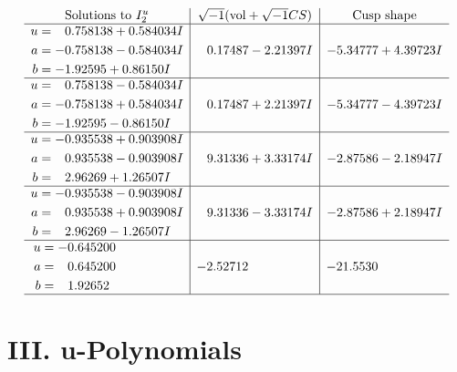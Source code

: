 \documentclass[1p]{elsarticle_modified}
\theoremstyle{definition}
\newcommand{\I}{\sqrt{-1}}
\begin{document}
$$\begin{array}{c|c|c}  
\text{Solutions to }I^u_{2}& \I (\text{vol} + \sqrt{-1}CS) & \text{Cusp shape}\\
 \hline 
\begin{aligned}
u &= \phantom{-}0.758138 + 0.584034 I \\
a &= -0.758138 - 0.584034 I \\
b &= -1.92595 + 0.86150 I\end{aligned}
 & \phantom{-}0.17487 - 2.21397 I & -5.34777 + 4.39723 I \\ \hline\begin{aligned}
u &= \phantom{-}0.758138 - 0.584034 I \\
a &= -0.758138 + 0.584034 I \\
b &= -1.92595 - 0.86150 I\end{aligned}
 & \phantom{-}0.17487 + 2.21397 I & -5.34777 - 4.39723 I \\ \hline\begin{aligned}
u &= -0.935538 + 0.903908 I \\
a &= \phantom{-}0.935538 - 0.903908 I \\
b &= \phantom{-}2.96269 + 1.26507 I\end{aligned}
 & \phantom{-}9.31336 + 3.33174 I & -2.87586 - 2.18947 I \\ \hline\begin{aligned}
u &= -0.935538 - 0.903908 I \\
a &= \phantom{-}0.935538 + 0.903908 I \\
b &= \phantom{-}2.96269 - 1.26507 I\end{aligned}
 & \phantom{-}9.31336 - 3.33174 I & -2.87586 + 2.18947 I \\ \hline\begin{aligned}
u &= -0.645200\phantom{ +0.000000I} \\
a &= \phantom{-}0.645200\phantom{ +0.000000I} \\
b &= \phantom{-}1.92652\phantom{ +0.000000I}\end{aligned}
 & -2.52712\phantom{ +0.000000I} & -21.5530\phantom{ +0.000000I}\\
 \hline 
 \end{array}$$\newpage
\newpage\renewcommand{\arraystretch}{1}
\centering \section*{ III. u-Polynomials}
\end{document}
